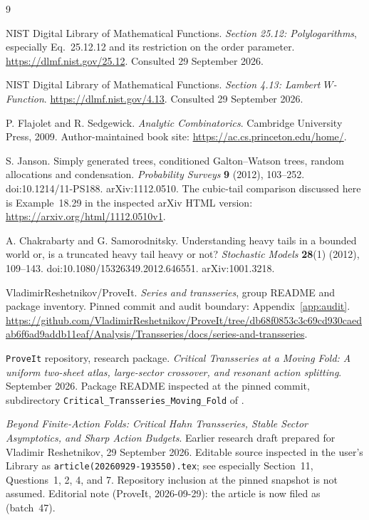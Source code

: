 \documentclass[11pt,a4paper]{article}
\numberwithin{equation}{section}
\theoremstyle{definition}
\theoremstyle{remark}
\newcommand{\repo}{\texttt{ProveIt}}
\begin{document}
\begin{thebibliography}{9}

NIST Digital Library of Mathematical Functions.
\emph{Section 25.12: Polylogarithms}, especially Eq.~25.12.12 and its
restriction on the order parameter.
\url{https://dlmf.nist.gov/25.12}. Consulted 29 September 2026.

NIST Digital Library of Mathematical Functions.
\emph{Section 4.13: Lambert $W$-Function}.
\url{https://dlmf.nist.gov/4.13}. Consulted 29 September 2026.

P. Flajolet and R. Sedgewick.
\emph{Analytic Combinatorics}. Cambridge University Press, 2009.
Author-maintained book site: \url{https://ac.cs.princeton.edu/home/}.

S. Janson.
Simply generated trees, conditioned Galton--Watson trees, random allocations
and condensation. \emph{Probability Surveys} \textbf{9} (2012), 103--252.
doi:10.1214/11-PS188. arXiv:1112.0510.
The cubic-tail comparison discussed here is Example~18.29 in the inspected
arXiv HTML version: \url{https://arxiv.org/html/1112.0510v1}.

A. Chakrabarty and G. Samorodnitsky.
Understanding heavy tails in a bounded world or, is a truncated heavy tail
heavy or not? \emph{Stochastic Models} \textbf{28}(1) (2012), 109--143.
doi:10.1080/15326349.2012.646551. arXiv:1001.3218.

VladimirReshetnikov/ProveIt.
\emph{Series and transseries}, group README and package inventory.
Pinned commit and audit boundary: Appendix~\ref{app:audit}.
\url{https://github.com/VladimirReshetnikov/ProveIt/tree/db68f0853c3c69cd930caedab6f6ad9addb11eaf/Analysis/Transseries/docs/series-and-transseries}.

\repo{} repository, research package.
\emph{Critical Transseries at a Moving Fold: A uniform two-sheet atlas,
large-sector crossover, and resonant action splitting}. September 2026.
Package README inspected at the pinned commit, subdirectory
\texttt{Critical\_Transseries\_Moving\_Fold} of \cite{repo}.

\emph{Beyond Finite-Action Folds: Critical Hahn Transseries, Stable Sector
Asymptotics, and Sharp Action Budgets}. Earlier research draft prepared
for Vladimir Reshetnikov, 29 September 2026. Editable source inspected
in the user's Library as \texttt{article(20260929-193550).tex};
see especially Section~11, Questions~1, 2, 4, and 7.
Repository inclusion at the pinned snapshot is not assumed.
Editorial note (ProveIt, 2026-09-29): the article is now filed as
(batch~47).


\end{thebibliography}
\end{document}

